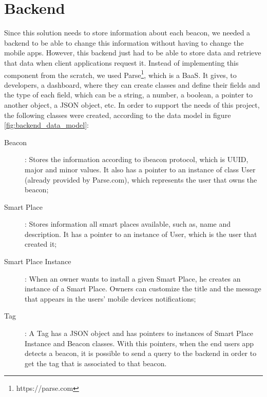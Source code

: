 \section{Backend}
\label{sec:backend}
Since this solution needs to store information about each beacon, we
needed a backend to be able to change this information without having
to change the mobile apps.
However, this backend just had to be able to store data and retrieve that
data when client applications request it.
Instead of implementing this component from the scratch, we used
Parse\footnote{https://parse.com}, which is a \gls{BaaS}.
It gives, to developers, a dashboard, where they can create classes
and define their fields and the type of each field, which can be a string,
a number, a boolean, a pointer to another object, a \gls{JSON} object, etc.
In order to support the needs of this project, the following classes were
created, according to the data model in figure \ref{fig:backend_data_model}:
\begin{description}
  \item[Beacon]: Stores the information according to ibeacon protocol,
  which is \gls{UUID}, major and minor values. It also has a pointer
  to an instance of class User (already provided by Parse.com),
  which represents the user that owns the beacon;
  \item[Smart Place]: Stores information all smart places available,
  such as, name and description. It has a pointer to an instance of
  User, which is the user that created it;
  \item[Smart Place Instance]: When an owner wants to install a given
  Smart Place, he creates an instance of a Smart Place. Owners can
  customize the title and the message that appears in the users'
  mobile devices notifications;
  \item[Tag]: A Tag has a \gls{JSON} object and has pointers to instances
  of Smart Place Instance and Beacon classes. With this pointers, when
  the end users app detects a beacon, it is possible to send a query to
  the backend in order to get the tag that is associated to that beacon.
\end{description}

